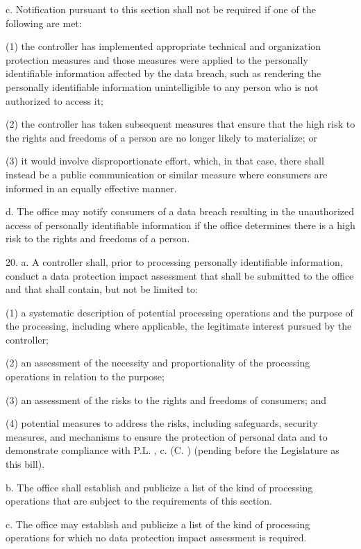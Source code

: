      c.     Notification pursuant to this section shall not be required if one of the following are met:

     (1)   the controller has implemented appropriate technical and organization protection measures and those measures were applied to the personally identifiable information affected by the data breach, such as rendering the personally identifiable information unintelligible to any person who is not authorized to access it;

     (2)   the controller has taken subsequent measures that ensure that the high risk to the rights and freedoms of a person are no longer likely to materialize; or

     (3)   it would involve disproportionate effort, which, in that case, there shall instead be a public communication or similar measure where consumers are informed in an equally effective manner.

     d.    The office may notify consumers of a data breach resulting in the unauthorized access of personally identifiable information if the office determines there is a high risk to the rights and freedoms of a person.

 

     20.  a.  A controller shall, prior to processing personally identifiable information, conduct a data protection impact assessment that shall be submitted to the office and that shall contain, but not be limited to:

     (1)   a systematic description of potential processing operations and the purpose of the processing, including where applicable, the legitimate interest pursued by the controller;

     (2)   an assessment of the necessity and proportionality of the processing operations in relation to the purpose;

     (3)   an assessment of the risks to the rights and freedoms of consumers; and

     (4)   potential measures to address the risks, including safeguards, security measures, and mechanisms to ensure the protection of personal data and to demonstrate compliance with P.L.    , c.    (C.      ) (pending before the Legislature as this bill).

     b.    The office shall establish and publicize a list of the kind of processing operations that are subject to the requirements of this section.

     c.     The office may establish and publicize a list of the kind of processing operations for which no data protection impact assessment is required.

